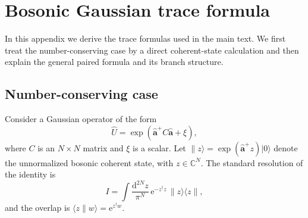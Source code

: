 \documentclass[twocolumn,aps,prb,10pt,amsmath,amssymb,amsthm,superscriptaddress]{revtex4-2}
\newcommand{\dd}{\mathrm{d}}
\newcommand{\ee}{\mathrm{e}}
\newcommand{\hc}{\dagger}
\newcommand{\bb}[1]{\bm{#1}}
\theoremstyle{remark}
\begin{document}
\section{Bosonic Gaussian trace formula}
\label{app:trace}

In this appendix we derive the trace formulas used in the main text. We first treat the number-conserving case by a direct coherent-state calculation and then explain the general paired formula and its branch structure.

\subsection{Number-conserving case}
\label{app:trace_number}

Consider a Gaussian operator of the form
\begin{equation}
    \hat U = \exp\left(\hat{\bb a}^+ C\hat{\bb a} + \xi\right),
\end{equation}
where $C$ is an $N\times N$ matrix and $\xi$ is a scalar. Let $\|z\rangle = \exp(\hat{\bb a}^+z)|0\rangle$ denote the unnormalized bosonic coherent state, with $z\in\mathbb C^N$. The standard resolution of the identity is
\begin{equation}
    I = \int \frac{\dd^{2N}z}{\pi^N}\,\ee^{-z^\hc z}\,\|z\rangle\langle z\|,
\end{equation}
and the overlap is $\langle z\|w\rangle = \ee^{z^\hc w}$.
\end{document}
